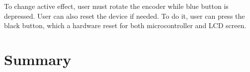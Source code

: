 \documentclass[a4paper,twoside,12pt]{book}
\newcounter{PagesWithoutNumbers}
\begin{document}
To change active effect, user must rotate the encoder
while blue button is depressed. User can also reset the device if needed.
To do it, user can press the black button,
which a hardware reset for both microcontroller and LCD screen.



\chapter{Summary}


\backmatter
{}
\setcounter{page}{\value{PagesWithoutNumbers}}

\pagestyle{onlyPageNumbers}

\printbibliography

\end{document}
